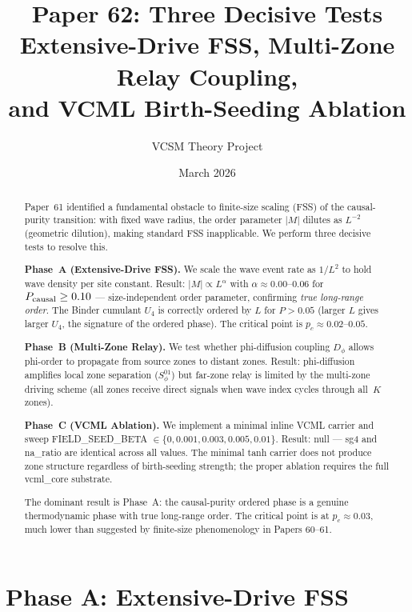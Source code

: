 \documentclass[12pt,a4paper]{article}
\title{\textbf{Paper 62: Three Decisive Tests\\
\large Extensive-Drive FSS, Multi-Zone Relay Coupling,\\
and VCML Birth-Seeding Ablation}}
\author{VCSM Theory Project}
\date{March 2026}
\begin{document}
\maketitle

\begin{abstract}
Paper~61 identified a fundamental obstacle to finite-size scaling (FSS)
of the causal-purity transition: with fixed wave radius, the order parameter
$|M|$ dilutes as $L^{-2}$ (geometric dilution), making standard FSS inapplicable.
We perform three decisive tests to resolve this.

\textbf{Phase~A (Extensive-Drive FSS).}
We scale the wave event rate as $1/L^2$ to hold wave density per site constant.
Result: $|M| \propto L^{\alpha}$ with $\alpha \approx 0.00$--$0.06$ for $P_{\rm causal} \geq 0.10$
--- size-independent order parameter, confirming \emph{true long-range order}.
The Binder cumulant $U_4$ is correctly ordered by $L$ for $P > 0.05$
(larger $L$ gives larger $U_4$, the signature of the ordered phase).
The critical point is $p_c \approx 0.02$--$0.05$.

\textbf{Phase~B (Multi-Zone Relay).}
We test whether phi-diffusion coupling $D_\phi$ allows phi-order to propagate
from source zones to distant zones.
Result: phi-diffusion amplifies local zone separation ($S_\phi^{01}$)
but far-zone relay is limited by the multi-zone driving scheme (all zones
receive direct signals when wave index cycles through all~$K$ zones).

\textbf{Phase~C (VCML Ablation).}
We implement a minimal inline VCML carrier and sweep FIELD\_SEED\_BETA
$\in \{0, 0.001, 0.003, 0.005, 0.01\}$.
Result: null --- sg4 and na\_ratio are identical across all values.
The minimal tanh carrier does not produce zone structure regardless of
birth-seeding strength; the proper ablation requires the full vcml\_core substrate.

The dominant result is Phase~A: the causal-purity ordered phase is a genuine
thermodynamic phase with true long-range order.
The critical point is at $p_c \approx 0.03$, much lower than suggested by
finite-size phenomenology in Papers 60--61.
\end{abstract}

\section{Phase A: Extensive-Drive FSS}
\label{sec:phaseA}
\end{document}
